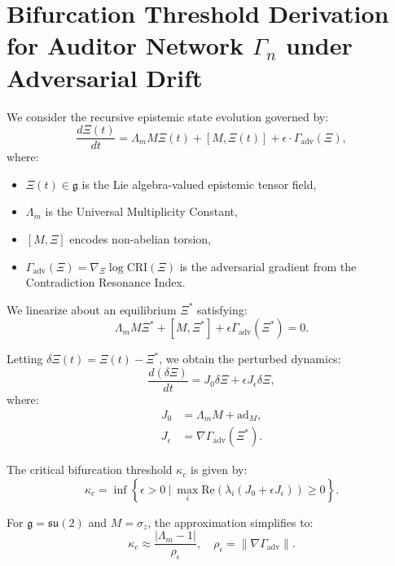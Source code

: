 \documentclass[12pt]{article}
\begin{document}
\section{Bifurcation Threshold Derivation for Auditor Network \texorpdfstring{$\Gamma_n$}{Γₙ} under Adversarial Drift}

We consider the recursive epistemic state evolution governed by:
\begin{equation}
    \frac{d\Xi(t)}{dt} = \Lambda_m M \Xi(t) + [M, \Xi(t)] + \epsilon \cdot \Gamma_{\text{adv}}(\Xi),
\end{equation}
where:
\begin{itemize}
    \item $\Xi(t) \in \mathfrak{g}$ is the Lie algebra-valued epistemic tensor field,
    \item $\Lambda_m$ is the Universal Multiplicity Constant,
    \item $[M, \Xi]$ encodes non-abelian torsion,
    \item $\Gamma_{\text{adv}}(\Xi) = \nabla_\Xi \log \mathrm{CRI}(\Xi)$ is the adversarial gradient from the Contradiction Resonance Index.
\end{itemize}

We linearize about an equilibrium $\Xi^*$ satisfying:
\begin{equation}
    \Lambda_m M \Xi^* + [M, \Xi^*] + \epsilon \Gamma_{\text{adv}}(\Xi^*) = 0.
\end{equation}

Letting $\delta \Xi(t) = \Xi(t) - \Xi^*$, we obtain the perturbed dynamics:
\begin{equation}
    \frac{d(\delta \Xi)}{dt} = J_0 \delta \Xi + \epsilon J_\epsilon \delta \Xi,
\end{equation}
where:
\begin{align}
    J_0 &= \Lambda_m M + \mathrm{ad}_M, \\
    J_\epsilon &= \nabla \Gamma_{\text{adv}}(\Xi^*).
\end{align}

The critical bifurcation threshold $\kappa_c$ is given by:
\begin{equation}
    \kappa_c = \inf \left\{ \epsilon > 0 \ \bigg| \ \max_i \mathrm{Re}\left( \lambda_i(J_0 + \epsilon J_\epsilon) \right) \geq 0 \right\}.
\end{equation}

For $\mathfrak{g} = \mathfrak{su}(2)$ and $M = \sigma_z$, the approximation simplifies to:
\begin{equation}
    \kappa_c \approx \frac{|\Lambda_m - 1|}{\rho_\epsilon}, \quad \rho_\epsilon = \|\nabla \Gamma_{\text{adv}}\|.
\end{equation}
\end{document}
